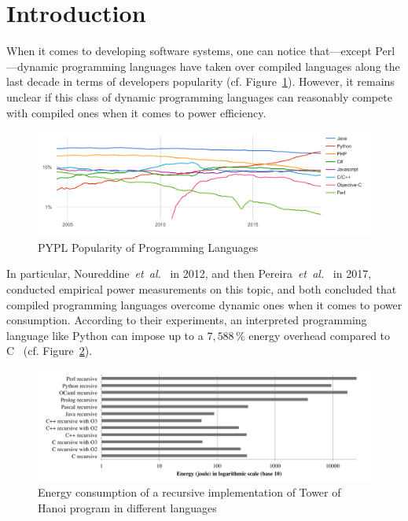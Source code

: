 
\section{Introduction}


When it comes to developing software systems, one can notice that---except Perl---dynamic programming languages have taken over compiled languages along the last decade in terms of developers popularity (cf. Figure~\ref{fig:pypl}).
However, it remains unclear if this class of dynamic programming languages can reasonably compete with compiled ones when it comes to power efficiency.

\begin{figure}[htbp]
    \includegraphics[width=\linewidth]{imgs/programminglanguangespopularity.png}
    \caption{PYPL Popularity of Programming Languages~\cite{noauthor_pypl_nodate}}
    \label{fig:pypl}
\end{figure}

In particular, Noureddine~\emph{et~al.}~\cite{noureddine_preliminary_2012} in 2012, and then Pereira~\emph{et~al.}~\cite{pereira_energy_2017} in 2017, conducted empirical power measurements on this topic, and both concluded that compiled programming languages overcome dynamic ones when it comes to power consumption.
According to their experiments, an interpreted programming language like Python can impose up to a $7,588\,\%$ energy overhead compared to C~\cite{pereira_energy_2017} (cf. Figure~\ref{fig:hannoi}).

\begin{figure}[htbp]
    \includegraphics[width=\linewidth]{imgs/hannoiimplementation.png}
    \caption{Energy consumption of a recursive implementation of Tower of Hanoi program in different languages~\cite{noureddine_preliminary_2012}}
    \label{fig:hannoi}
\end{figure}
